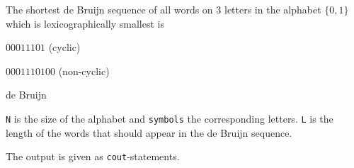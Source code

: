 The shortest de Bruijn sequence of all words on $3$ letters in the alphabet
$\{0,1\}$ which is lexicographically smallest is

$00011101$ (cyclic)

$0001110100$ (non-cyclic)

\begin{algorithm}{de Bruijn}

\desc
{\tt N} is the size of the alphabet and {\tt symbols} the corresponding
letters. {\tt L} is the length of the words that should appear in the de
Bruijn sequence.

The output is given as {\tt cout}-statements.
\end{algorithm}
